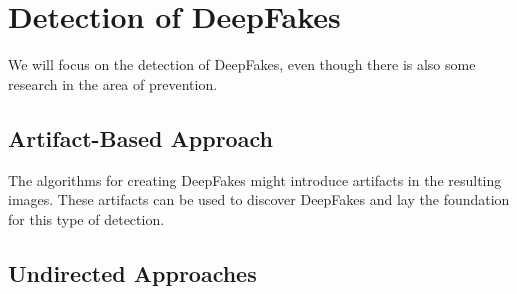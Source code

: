 \section{Detection of DeepFakes}
We will focus on the detection of DeepFakes, even though there is also some research in the area of
prevention.

\subsection{Artifact-Based Approach}
The algorithms for creating DeepFakes might introduce artifacts in the resulting images.
These artifacts can be used to discover DeepFakes and lay the foundation for this type of detection.

\subsection{Undirected Approaches}
